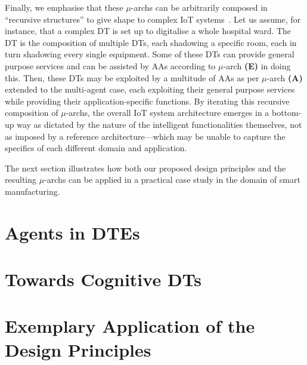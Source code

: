 Finally, we emphasise that these $\mu$-archs can be arbitrarily composed in ``recursive structures'' to give shape to complex IoT systems~\cite{WAN2021880}. 
Let us assume, for instance, that a complex DT is set up to digitalise a whole hospital ward. 
The DT is the composition of multiple DTs, each shadowing a specific room, each in turn shadowing every single equipment. 
Some of these DTs can provide general purpose services and can be assisted by AAs according to $\mu$-arch \textbf{(E)} in doing this. 
Then, these DTs may be exploited by a multitude of AAs as per $\mu$-arch \textbf{(A)} extended to the multi-agent case, each exploiting their general purpose services while providing their application-specific functions. 
%
By iterating this recursive composition of $\mu$-archs, the overall IoT system architecture emerges in a bottom-up way as dictated by the nature of the intelligent functionalities themselves, not as imposed by a reference architecture---which may be unable to capture the specifics of each different domain and application. 

The next section illustrates how both our proposed design principles and the resulting $\mu$-archs can be applied in a practical case study in the domain of smart manufacturing.


\section{Agents in \aclp{DTE}}

\section{Towards Cognitive \aclp{DT}}



\section{Exemplary Application of the Design Principles}
\label{sec:case-study}


